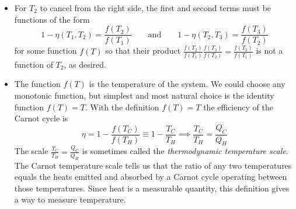 \documentclass[11pt, a4paper]{article}
\begin{document}
\begin{itemize}
	\item For $ T_{2} $ to cancel from the right side, the first and second terms must be functions of the form 
	\begin{equation*}
		1 - \eta(T_{1}, T_{2}) = \frac{f(T_{2})}{f(T_{1})} \qquad \text{and} \qquad 1 - \eta(T_{2}, T_{3}) = \frac{f(T_{3})}{f(T_{2})} 
	\end{equation*}
	for some function $ f(T) $ so that their product $ \frac{f(T_{2})}{f(T_{1})}  \frac{f(T_{3})}{f(T_{2})} = \frac{f(T_{3})}{f(T_{1})}$ is not a function of $ T_{2} $, as desired. 
	
	\item The function $ f(T) $ is the temperature of the system. We could choose any monotonic function, but simplest and most natural choice is the identity function $ f(T) = T $. With the definition $ f(T) = T $ the efficiency of the Carnot cycle is 
	\begin{equation*}
		\eta = 1 - \frac{f(T_{C})}{f(T_{H})} \equiv 1 - \frac{T_{C}}{T_{H}} \implies  \frac{T_{C}}{T_{H}} = \frac{Q_{C}}{Q_{H}}
	\end{equation*}
	The scale $ \frac{T_{C}}{T_{H}} = \frac{Q_{C}}{Q_{H}} $ is sometimes called the \textit{thermodynamic temperature scale}. The Carnot temperature scale tells us that the ratio of any two temperatures equals the heats emitted and absorbed by a Carnot cycle operating between those temperatures. Since heat is a measurable quantity, this definition gives a way to measure temperature.
\end{itemize}
\end{document}
